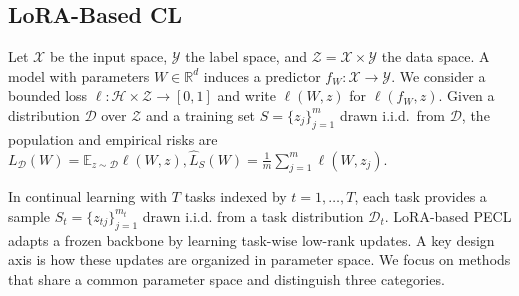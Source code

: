 \documentclass[10pt]{article} %
\begin{document}
\subsection{LoRA-Based CL}
\label{sec:pecl-setup}

Let $\mathcal X$ be the input space, $\mathcal Y$ the label space, and $\mathcal Z = \mathcal X \times \mathcal Y$ the data space.
A model with parameters $W \in \mathbb R^d$ induces a predictor $f_W : \mathcal X \to \mathcal Y$.
We consider a bounded loss $\ell : \mathcal H \times \mathcal Z \to [0,1]$ and write $\ell(W,z)$ for $\ell(f_W,z)$. 
Given a distribution $\mathcal D$ over $\mathcal Z$ and a training set $S=\{z_j\}_{j=1}^m$ drawn i.i.d.\ from $\mathcal D$, the population and empirical risks are
$
L_{\mathcal D}(W)
=
\mathbb E_{z\sim\mathcal D}\ell(W,z),
\hat L_{S}(W)
=
\frac{1}{m}\sum_{j=1}^{m}\ell(W,z_{j}).
$







In continual learning with \(T\) tasks indexed by \(t=1,\dots,T\), each task provides a sample \(S_t =\{z_{tj}\}_{j=1}^{m_t}\) drawn i.i.d. from a task distribution \(\mathcal{D}_t\). LoRA-based PECL adapts a frozen backbone by learning task-wise low-rank updates. A key design axis is how these updates are organized in parameter space. We focus on methods that share a common parameter space and distinguish three categories.
\end{document}
